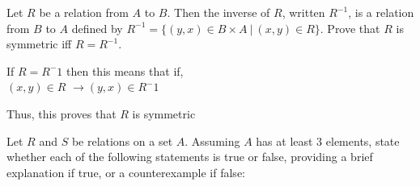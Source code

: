 \documentclass[addpoints]{exam}
\begin{document}
\begin{questions}
\begin{parts}
\end{parts}

\question Let $R$ be a relation from $A$ to $B$. Then the inverse of $R$, written $R^{-1}$, is a relation from $B$ to $A$ defined by $R^{-1} = \{(y,x) \in B \times A \:|\: (x,y) \in R\}$. Prove that $R$ is symmetric iff $R = R^{-1}$.

  \begin{solution}
    
    If $R = R^-1$ then this means that if,
    \\ $(x,y) \in R$ $\rightarrow (y,x) \in R^-1$ 
    
    Thus, this proves that $R$ is symmetric
    
    
    
  \end{solution}

\question Let $R$ and $S$ be relations on a set $A$. Assuming $A$ has at least 3 elements, state whether each of the following statements is true or false, providing a brief explanation if true, or a counterexample if false:


  \begin{solution}
    
    \begin{parts}

\end{parts}
\end{solution}
\end{questions}
\end{document}
